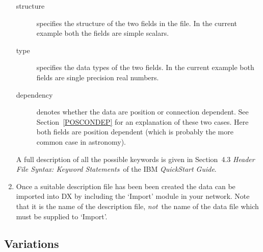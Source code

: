 \begin{enumerate}
\begin{description}
    \item[structure] specifies the structure of the two fields in the
     file. In the current example both the fields are simple scalars.

    \item[type] specifies the data types of the two fields. In the
     current example both fields are single precision real numbers.

    \item[dependency] denotes whether the data are position or
     connection dependent. See Section~\ref{POSCONDEP} for an
     explanation of these two cases. Here both fields are position
     dependent (which is probably the more common case in astronomy).

  \end{description}

   A full description of all the possible keywords is given in
   Section~4.3 {\it Header File Syntax: Keyword Statements}\, of the
   IBM {\it QuickStart Guide}\cite{QUICKS}.

  \item Once a suitable description file has been been created the data
   can be imported into DX by including the `Import' module in your
   network. Note that it is the name of the description file, {\it not}\,
   the name of the data file which must be supplied to `Import'.

\end{enumerate}

\subsection{Variations}

